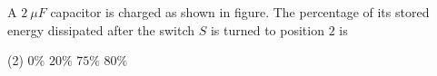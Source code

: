 
\item A \(2 \ \mu F\) capacitor is charged as shown in figure. The percentage of its stored energy dissipated after the switch \( S \) is turned to position \(2\) is
    \begin{center}
    \end{center}
    \begin{tasks}(2)
        \task \(0\%\)
        \task \(20\%\)
        \task \(75\%\)
        \task \(80\%\)
    \end{tasks}
